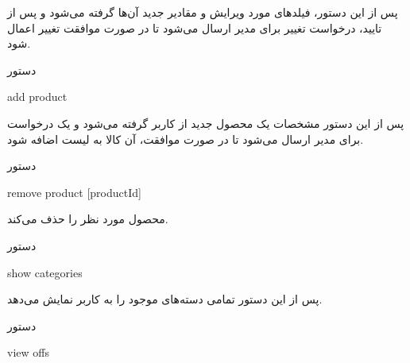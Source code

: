 \documentclass[]{article}
\begin{document}
 پس از این دستور، فیلد‌های مورد ویرایش و مقادیر جدید آن‌ها گرفته می‌شود و پس از تایید، درخواست تغییر برای مدیر ارسال می‌شود تا در صورت موافقت تغییر اعمال شود.

\hrulefill

\begin{mybox}[colback=yellow]{دستور}

\begin{latin}

add product 

\end{latin}

\end{mybox}


پس از این دستور مشخصات یک محصول جدید از کاربر گرفته می‌شود و یک درخواست برای مدیر ارسال می‌شود تا در صورت موافقت، آن کالا به لیست اضافه شود.

\hrulefill

\begin{mybox}[colback=yellow]{دستور}

\begin{latin}

remove product [productId] 

\end{latin}

\end{mybox}

محصول مورد نظر را حذف می‌کند.


\hrulefill

\newpage

\begin{mybox}[colback=yellow]{دستور}

\begin{latin}

show categories 

\end{latin}

\end{mybox}

پس از این دستور تمامی دسته‌های موجود را به کاربر نمایش می‌دهد.

\hrulefill

\begin{mybox}[colback=yellow]{دستور}

\begin{latin}

view offs

\end{latin}

\end{mybox}
\end{document}

